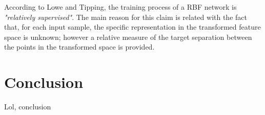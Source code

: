 \documentclass[9pt,journal,compsoc]{IEEEtran}
\begin{document}
According to Lowe and Tipping\cite{lowe1997neuroscale}, the training process of a RBF network is \emph{"relatively supervised"}. The main reason for this claim is related with the fact that, for each input sample, the specific representation in the transformed feature space is unknown; however a relative measure of the target separation between the points in the transformed space is provided.

\section{Conclusion}\label{sec:conclusion}

Lol, conclusion



\end{document}
